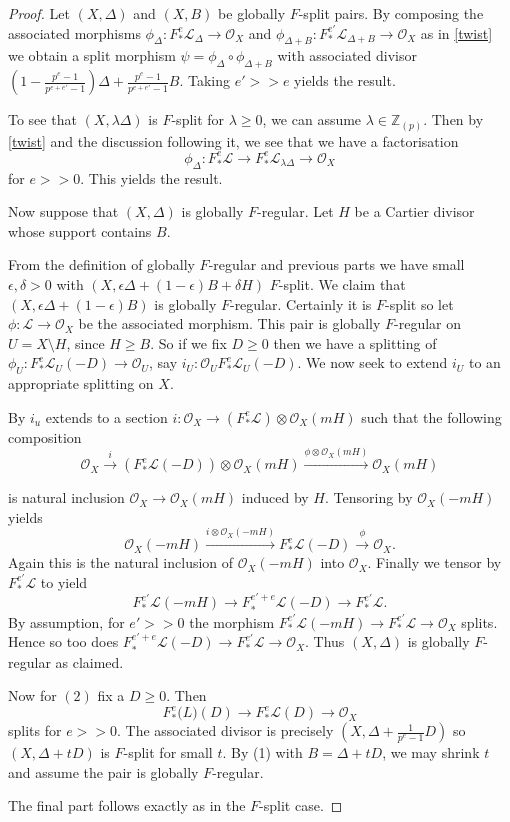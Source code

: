 \documentclass[a4paper,12pt]{book}
\newcommand{\Fe}[1][e]{F^{#1}_{*}}
\newcommand{\ox}[1][X]{\mathcal{O}_{#1}}
\newcommand{\zp}{\mathbb{Z}_{(p)}}
\begin{document}
\begin{proof}
	Let $(X,\Delta)$ and $(X,B)$ be globally $F$-split pairs. By composing the associated morphisms $\phi_{\Delta} \colon \Fe \mathcal{L}_{\Delta} \to \ox$ and $\phi_{\Delta+B} \colon \Fe[e'] \mathcal{L}_{\Delta+B} \to \ox$ as in \autoref{twist} we obtain a split morphism $\psi=\phi_{\Delta}\circ \phi_{\Delta+B}$ with associated divisor $(1-\frac{p^{e}-1}{p^{e+e'}-1})\Delta+ \frac{p^{e}-1}{p^{e+e'}-1}B$. Taking $e'>>e$ yields the result. 
	
	To see that $(X,\lambda \Delta)$ is $F$-split for $\lambda \geq 0$, we can assume $\lambda \in \zp$. Then by \autoref{twist} and the discussion following it, we see that we have a factorisation $$\phi_{\Delta} \colon \Fe \mathcal{L} \to \Fe \mathcal{L}_{\lambda \Delta} \to \ox$$ for $e>>0$. This yields the result.
	
	Now suppose that $(X,\Delta)$ is globally $F$-regular. Let $H$ be a Cartier divisor whose support contains $B$. 
	
	From the definition of globally $F$-regular and previous parts we have small $\epsilon, \delta > 0$ with $(X,\epsilon \Delta +(1-\epsilon)B+\delta H)$ $F$-split. We claim that $(X,\epsilon \Delta +(1-\epsilon)B)$ is globally $F$-regular. Certainly it is $F$-split so let $\phi\colon \mathcal{L} \to \ox$ be the associated morphism. This pair is globally $F$-regular on $U=X\setminus H$, since $H \geq B$. So if we fix $D\geq 0$ then we have a splitting of $\phi_{U}\colon \Fe \mathcal{L}_{U}(-D) \to \ox[U]$, say $i_{U}\colon \ox[U] \Fe \mathcal{L}_{U}(-D)$. We now seek to extend $i_{U}$ to an appropriate splitting on $X$.
	
	By \cite[Chapter II, Lemma 5.14(b)]{Ha77} $i_{u}$ extends to a section $i:\ox \to (\Fe \mathcal{L}) \otimes \ox(mH)$ such that the following composition 
	\[\ox \xrightarrow{i} (\Fe \mathcal{L}(-D)) \otimes \ox(mH) \xrightarrow{\phi\otimes\ox(mH)} \ox(mH)\]
	
	is natural inclusion $\ox \to \ox(mH)$ induced by $H$. Tensoring by $\ox(-mH)$ yields
	\[\ox(-mH) \xrightarrow{i\otimes \ox(-mH)} \Fe \mathcal{L}(-D) \xrightarrow{\phi} \ox.\]
	Again this is the natural inclusion of $\ox(-mH)$ into $\ox$. Finally we tensor by $\Fe[e']\mathcal{L}$ to yield
	$$\Fe[e']\mathcal{L}(-mH) \to \Fe[e'+e]\mathcal{L}(-D) \to \Fe[e']\mathcal{L}.$$
	By assumption, for $e'>>0$ the morphism $\Fe[e']\mathcal{L}(-mH) \to  \Fe[e']\mathcal{L} \to \ox$ splits. Hence so too does $\Fe[e'+e]\mathcal{L}(-D) \to \Fe[e']\mathcal{L} \to \ox$. Thus $(X,\Delta)$ is globally $F$-regular as claimed.
		
	Now for $(2)$ fix a $D \geq 0$. Then $$\Fe \mathcal(L)(D) \to \Fe \mathcal{L}(D) \to \ox $$ splits for $e>>0$. The associated divisor is precisely $(X,\Delta+\frac{1}{p^{e}-1}D)$ so $(X,\Delta+tD)$ is $F$-split for small $t$. By (1) with $B=\Delta+tD$, we may shrink $t$ and assume the pair is globally $F$-regular. 
	
	The final part follows exactly as in the $F$-split case.
	
\end{proof}
\end{document}
